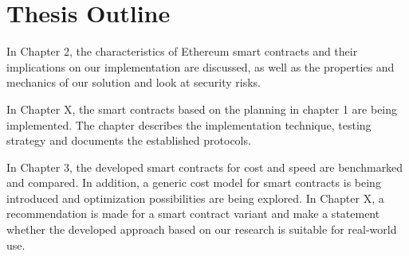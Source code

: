 \section{Thesis Outline}

In Chapter 2, the characteristics of Ethereum smart contracts and their implications on our implementation are discussed, as well as the properties and mechanics of our solution and look at security risks.

In Chapter X, the smart contracts based on the planning in chapter 1 are being implemented. The chapter describes the implementation technique, testing strategy and documents the established protocols.

In Chapter 3, the developed smart contracts for cost and speed are benchmarked and compared. In addition, a generic cost model for smart contracts is being introduced and optimization possibilities are being explored.
In Chapter X, a recommendation is made for a smart contract variant and make a statement whether the developed approach based on our research is suitable for real-world use.
